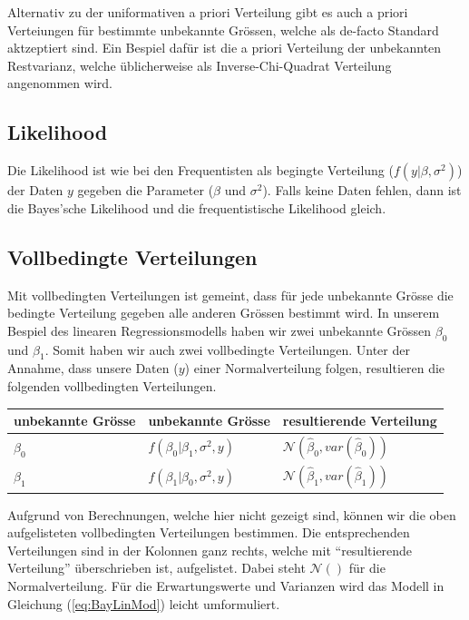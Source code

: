 \documentclass[]{book}
\begin{document}
Alternativ zu der uniformativen a priori Verteilung gibt es auch a
priori Verteiungen für bestimmte unbekannte Grössen, welche als de-facto
Standard aktzeptiert sind. Ein Bespiel dafür ist die a priori Verteilung
der unbekannten Restvarianz, welche üblicherweise als
Inverse-Chi-Quadrat Verteilung angenommen wird.

\subsection{Likelihood}\label{likelihood}

Die Likelihood ist wie bei den Frequentisten als begingte Verteilung
(\(f(y | \beta, \sigma^2)\)) der Daten \(y\) gegeben die Parameter
(\(\beta\) und \(\sigma^2\)). Falls keine Daten fehlen, dann ist die
Bayes'sche Likelihood und die frequentistische Likelihood gleich.

\subsection{Vollbedingte Verteilungen}\label{vollbedingte-verteilungen}

Mit vollbedingten Verteilungen ist gemeint, dass für jede unbekannte
Grösse die bedingte Verteilung gegeben alle anderen Grössen bestimmt
wird. In unserem Bespiel des linearen Regressionsmodells haben wir zwei
unbekannte Grössen \(\beta_0\) und \(\beta_1\). Somit haben wir auch
zwei vollbedingte Verteilungen. Unter der Annahme, dass unsere Daten
(\(y\)) einer Normalverteilung folgen, resultieren die folgenden
vollbedingten Verteilungen.

\vspace{2ex}

\begin{center}
\begin{tabular}{lll}
\hline
unbekannte Grösse  &  unbekannte Grösse                    &  resultierende Verteilung \\
\hline
$\beta_0$          &  $f(\beta_0 | \beta_1, \sigma^2, y)$  &  $\mathcal{N}\left(\hat{\beta}_0, var(\hat{\beta}_0)\right)$ \\
$\beta_1$          &  $f(\beta_1 | \beta_0, \sigma^2, y)$  &  $\mathcal{N}\left(\hat{\beta}_1, var(\hat{\beta}_1)\right)$ \\
\hline
\end{tabular}
\end{center}

Aufgrund von Berechnungen, welche hier nicht gezeigt sind, können wir
die oben aufgelisteten vollbedingten Verteilungen bestimmen. Die
entsprechenden Verteilungen sind in der Kolonnen ganz rechts, welche mit
``resultierende Verteilung'' überschrieben ist, aufgelistet. Dabei steht
\(\mathcal{N}()\) für die Normalverteilung. Für die Erwartungswerte und
Varianzen wird das Modell in Gleichung (\ref{eq:BayLinMod}) leicht
umformuliert.
\end{document}
